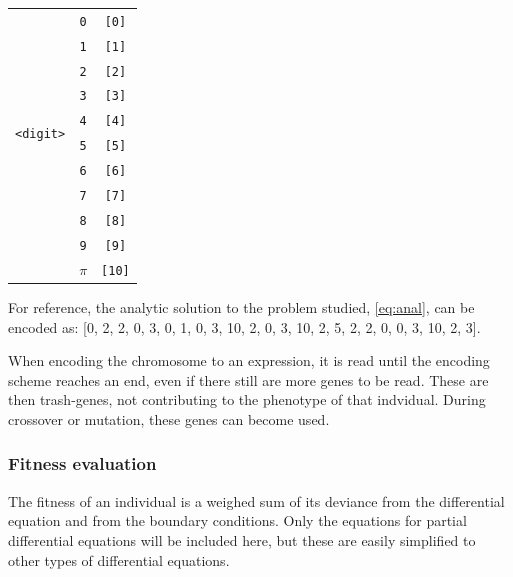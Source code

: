 \documentclass[multicolumn, 9pt]{extarticle}
\begin{document}
\begin{table}[h]
\begin{tabular}{ccc}
		\midrule

		\multirow{10}{*}{\texttt{<digit>}}
		     & \multicolumn{1}{c}{\texttt{0}}                  & \multicolumn{1}{c}{\texttt{[0]}}  \\
		     & \multicolumn{1}{c}{\texttt{1}}                  & \multicolumn{1}{c}{\texttt{[1]}}  \\
		     & \multicolumn{1}{c}{\texttt{2}}                  & \multicolumn{1}{c}{\texttt{[2]}}  \\
		     & \multicolumn{1}{c}{\texttt{3}}                  & \multicolumn{1}{c}{\texttt{[3]}}  \\
		     & \multicolumn{1}{c}{\texttt{4}}                  & \multicolumn{1}{c}{\texttt{[4]}}  \\
		     & \multicolumn{1}{c}{\texttt{5}}                  & \multicolumn{1}{c}{\texttt{[5]}}  \\
		     & \multicolumn{1}{c}{\texttt{6}}                  & \multicolumn{1}{c}{\texttt{[6]}}  \\
		     & \multicolumn{1}{c}{\texttt{7}}                  & \multicolumn{1}{c}{\texttt{[7]}}  \\
		     & \multicolumn{1}{c}{\texttt{8}}                  & \multicolumn{1}{c}{\texttt{[8]}}  \\
		     & \multicolumn{1}{c}{\texttt{9}}                  & \multicolumn{1}{c}{\texttt{[9]}}  \\
		     & \multicolumn{1}{c}{\texttt{$\pi$}}              & \multicolumn{1}{c}{\texttt{[10]}} \\

		\bottomrule
	\end{tabular}
\end{table}


For reference, the analytic solution to the problem studied, \eqref{eq:anal}, can be encoded as: [0, 2, 2, 0, 3, 0, 1, 0, 3, 10, 2, 0, 3, 10, 2, 5, 2, 2, 0, 0, 3, 10, 2, 3].

When encoding the chromosome to an expression, it is read until the encoding scheme reaches an end, even if there still are more genes to be read. These are then trash-genes, not contributing to the phenotype of that indvidual. During crossover or mutation, these genes can become used.

\subsubsection{Fitness evaluation}
The fitness of an individual is a weighed sum of its deviance from the differential equation and from the boundary conditions. Only the equations for partial differential equations will be included here, but these are easily simplified to other types of differential equations.
\end{document}
